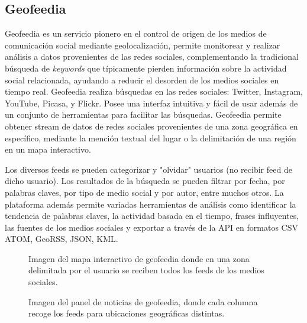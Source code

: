 \subsection{Geofeedia}

Geofeedia \cite{geofeedia} es un servicio pionero en el control de origen de los medios de comunicación social mediante geolocalización, permite monitorear y  realizar análisis a datos provenientes de las redes sociales, complementando la tradicional búsqueda de \emph{keywords} que típicamente pierden información sobre la actividad social relacionada, ayudando a reducir el desorden de los medios sociales en tiempo real. Geofeedia realiza búsquedas en las redes sociales: Twitter, Instagram, YouTube, Picasa, y Flickr. Posee una interfaz intuitiva y fácil de usar además de un conjunto de herramientas para facilitar las búsquedas. Geofeedia permite obtener stream de datos de redes sociales provenientes de una zona geográfica en específico, mediante la mención textual del lugar o la delimitación de una región en un mapa interactivo.

Los diversos feeds se pueden categorizar y "olvidar" usuarios (no recibir feed de dicho usuario). Los resultados de la búsqueda se pueden filtrar por fecha, por palabras claves, por tipo de medio social y por autor, entre muchos otros. La plataforma además permite variadas herramientas de análisis como identificar la tendencia de palabras claves, la actividad basada en el tiempo, frases influyentes, las fuentes de los medios sociales y exportar a través de la API en formatos CSV ATOM, GeoRSS, JSON, KML.

\begin{figure}[H]
	\centering
	\begin{minipage}[t]{.45\textwidth}
		\begin{center}
			  \caption{Imagen del mapa interactivo de geofeedia donde en una zona delimitada por el usuario se reciben todos los feeds de los medios sociales.}
			  \label{fig:geofeedia1}
		\end{center}
	\end{minipage}
	\hfill
	\begin{minipage}[t]{.45\textwidth}
		\begin{center}
			\caption{Imagen del panel de noticias de geofeedia, donde cada columna recoge los feeds para ubicaciones geográficas distintas.}
			\label{fig:geofeedia2}
		\end{center}
	\end{minipage}
	\hfill
\end{figure}

